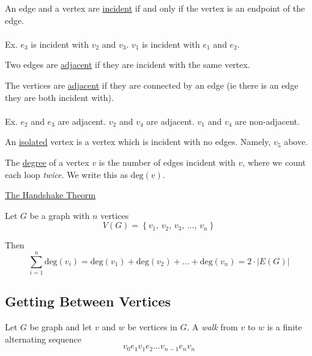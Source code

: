 \begin{definition}
    An edge and a vertex are \underline{incident} if and only if the vertex is an endpoint of the edge.
    \\ \\
    Ex. $e_3$ is incident with $v_2$ and $v_3$. $v_1$ is incident with $e_1$ and $e_2$.
\end{definition}

\begin{definition}
    Two edges are \underline{adjacent} if they are incident with the same vertex.

    The vertices are \underline{adjacent} if they are connected by an edge (ie there is an edge they are both incident with).
    \\ \\
    Ex. $e_2$ and $e_3$ are adjacent. $v_2$ and $v_4$ are adjacent. $v_1$ and $v_4$ are non-adjacent.
\end{definition}

\begin{definition}
    An \underline{isolated} vertex is a vertex which is incident with no edges. Namely, $v_5$ above.
\end{definition}

\begin{definition}
    The \underline{degree} of a vertex $v$ is the number of edges incident with $v$, where we count each loop \emph{twice}. We write this as $\text{deg}(v)$.
\end{definition}

\begin{theorm}
    \underline{The Handshake Theorm}

    Let $G$ be a graph with $n$ vertices $$V(G) = \left\{v_1,\,v_2,\,v_3,\,\dots,\,v_n\right\}$$

    Then $$\sum_{i=1}^n \text{deg}(v_i) = \text{deg}(v_1) + \text{deg}(v_2) + \dots + \text{deg}(v_n) = 2 \cdot |E(G)|$$
\end{theorm}

\subsection{Getting Between Vertices}
Let $G$ be graph and let $v$ and $w$ be vertices in $G$. A \emph{walk} from $v$ to $w$ is a finite alternating sequence 
\begin{equation}
    v_0 e_1 v_1 e_2 \dots v_{n-1}e_n v_n
\end{equation}

